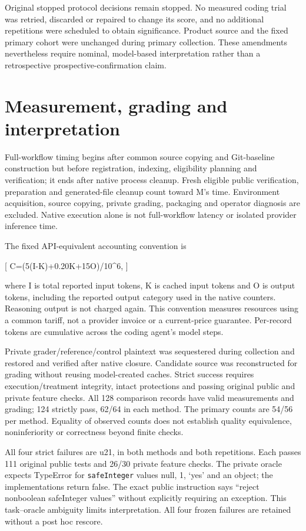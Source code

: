 \documentclass[manuscript,screen,nonacm]{acmart}
\begin{document}
Original stopped protocol decisions remain stopped. No measured coding
trial was retried, discarded or repaired to change its score, and no
additional repetitions were scheduled to obtain significance. Product
source and the fixed primary cohort were unchanged during primary
collection. These amendments nevertheless require nominal, model-based
interpretation rather than a retrospective prospective-confirmation
claim.

\section{Measurement, grading and
interpretation}\label{measurement-grading-and-interpretation}

Full-workflow timing begins after common source copying and Git-baseline
construction but before registration, indexing, eligibility planning and
verification; it ends after native process cleanup. Fresh eligible
public verification, preparation and generated-file cleanup count toward
M's time. Environment acquisition, source copying, private grading,
packaging and operator diagnosis are excluded. Native execution alone is
not full-workflow latency or isolated provider inference time.

The fixed API-equivalent accounting convention is

{[} C=(5(I-K)+0.20K+15O)/10\^{}6, {]}

where I is total reported input tokens, K is cached input tokens and O
is output tokens, including the reported output category used in the
native counters. Reasoning output is not charged again. This convention
measures resources using a common tariff, not a provider invoice or a
current-price guarantee. Per-record tokens are cumulative across the
coding agent's model steps.

Private grader/reference/control plaintext was sequestered during
collection and restored and verified after native closure. Candidate
source was reconstructed for grading without reusing model-created
caches. Strict success requires execution/treatment integrity, intact
protections and passing original public and private feature checks. All
128 comparison records have valid measurements and grading; 124 strictly
pass, 62/64 in each method. The primary counts are 54/56 per method.
Equality of observed counts does not establish quality equivalence,
noninferiority or correctness beyond finite checks.

All four strict failures are u21, in both methods and both repetitions.
Each passes 111 original public tests and 26/30 private feature checks.
The private oracle expects TypeError for \texttt{safeInteger} values
null, 1, `yes' and an object; the implementations return false. The
exact public instruction says ``reject nonboolean safeInteger values''
without explicitly requiring an exception. This task--oracle ambiguity
limits interpretation. All four frozen failures are retained without a
post hoc rescore.
\end{document}
